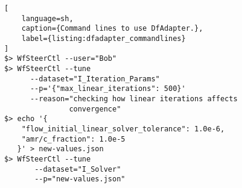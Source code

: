 \noindent\begin{minipage}[t]{1.0\linewidth}
\begin{lstlisting}[
    language=sh,
    caption={Command lines to use DfAdapter.},
    label={listing:dfadapter_commandlines}
]
$> WfSteerCtl --user="Bob"
$> WfSteerCtl --tune
      --dataset="I_Iteration_Params"
      --p='{"max_linear_iterations": 500}'
      --reason="checking how linear iterations affects
               convergence"
$> echo '{
    "flow_initial_linear_solver_tolerance": 1.0e-6,
    "amr/c_fraction": 1.0e-5
   }' > new-values.json
$> WfSteerCtl --tune
       --dataset="I_Solver"
       --p="new-values.json"

\end{lstlisting}
\end{minipage}
